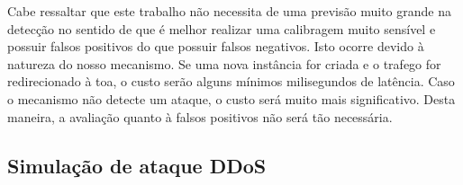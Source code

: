 Cabe ressaltar que este trabalho não necessita de uma previsão muito grande na detecção no sentido de que é melhor realizar uma calibragem muito sensível e possuir falsos positivos do que possuir falsos negativos. Isto ocorre devido à natureza do nosso mecanismo. Se uma nova instância for criada e o trafego for redirecionado à toa, o custo serão alguns mínimos milisegundos de latência. Caso o mecanismo não detecte um ataque, o custo será muito mais significativo. Desta maneira, a avaliação quanto à falsos positivos não será tão necessária. %


\subsection{Simulação de ataque DDoS}
